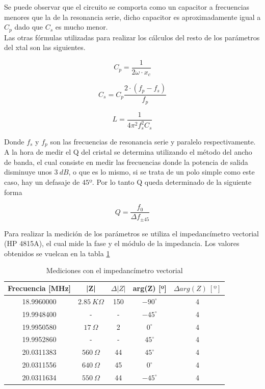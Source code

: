 \documentclass[a4paper,10pt]{article}
\begin{document}
		\indent Se puede observar que el circuito se comporta como un capacitor
		a frecuencias menores que la de la resonancia serie, dicho capacitor es 
		aproximadamente igual a $C_p$ dado que $C_s$ es mucho menor. \\
		\indent Las otras fórmulas utilizadas para realizar los cálculos del 
		resto de los parámetros del xtal son las siguientes.
	
		\begin{equation} \label{eq001}
			C_p = \frac{1}{2\omega\cdot x_c}		
		\end{equation}
		
		\begin{equation} \label{eq002}
			C_s = C_p \frac{2\cdot(f_p - f_s)}{f_p}
		\end{equation}

		\begin{equation} \label{eq003}
			L = \frac{1}{4\pi^2f_s^2C_s}
		\end{equation}

		\indent Donde $f_s$ y $f_p$ son las frecuencias de resonancia serie y 
		paralelo respectivamente. \\
		\indent A la hora de medir el Q del cristal se determina utilizando el 
		método del ancho de banda, el cual consiste en medir las frecuencias 
		donde la potencia de salida disminuye unos $3~dB$, o que es lo mismo, 
		si se trata de un polo simple como este caso, hay un defasaje de $45º$.
		Por lo tanto Q queda determinado de la siguiente forma
		
		\begin{equation} \label{eq004}
			Q = \frac{f_0}{\Delta f_{\pm45}}
		\end{equation}
		
		\indent Para realizar la medición de los parámetros se utiliza el 
		impedancímetro vectorial (HP 4815A), el cual mide la fase y el módulo de
		la impedancia. Los valores obtenidos se vuelcan en la tabla \ref{tab003}
		
		\begin{table}[!htp]
			\centering
			\begin{tabular}{|c|c|c|c|c|}
				\hline
				Frecuencia [MHz] & |Z| & $\Delta |Z|$ & arg(Z) [º] & 
				$\Delta arg(Z)~[º]$ \\
				\hline
				18.9960000 & $2.85~K\Omega$ & 150 & $-90^{\circ}$ & 4 \\
				\hline
				19.9948400 & - & - & $-45^{\circ}$ & 4 \\ 
				\hline
				19.9950580 & $17~\Omega$ & 2 & $0^{\circ}$ & 4 \\
				\hline
				19.9952860 & - & - & $45^{\circ}$ & 4 \\ 
				\hline									
				20.0311383 & $560~\Omega$ & 44 & $45^{\circ}$ & 4 \\
				\hline									
				20.0311556 & $640~\Omega$ & 45 & $0^{\circ}$ & 4 \\
				\hline									
				20.0311634 & $550~\Omega$ & 44 & $-45^{\circ}$ & 4 \\
				\hline									
			\end{tabular}
			\caption{Mediciones con el impedancímetro vectorial} \label{tab003}
		\end{table}	
		
\end{document}
